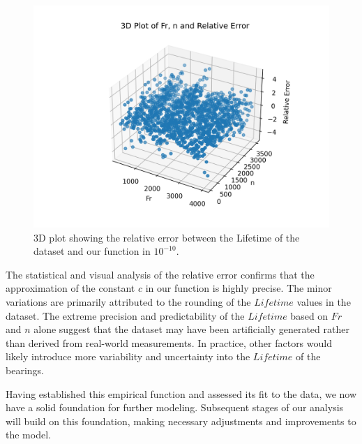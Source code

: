 \begin{figure}[ht]
    \centering
    \includegraphics[width=\textwidth]{assets/bearings-eda/3dplot-error.png}
    \caption{3D plot showing the relative error between the Lifetime of the dataset and our function in \(10^{-10}\).}
    \label{fig:bearings-error}
\end{figure}

The statistical and visual analysis of the relative error confirms that the approximation of the constant \(c\) in our function is highly precise. The minor variations are primarily attributed to the rounding of the \(Lifetime\) values in the dataset. The extreme precision and predictability of the \(Lifetime\) based on \(Fr\) and \(n\) alone suggest that the dataset may have been artificially generated rather than derived from real-world measurements. In practice, other factors would likely introduce more variability and uncertainty into the \(Lifetime\) of the bearings.

Having established this empirical function and assessed its fit to the data, we now have a solid foundation for further modeling. Subsequent stages of our analysis will build on this foundation, making necessary adjustments and improvements to the model.
